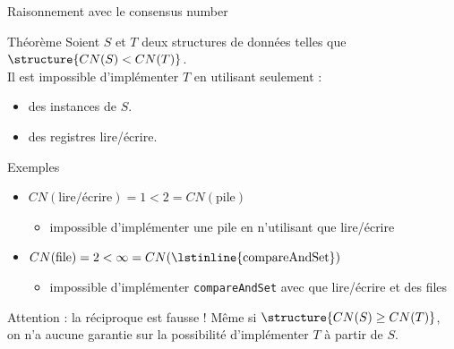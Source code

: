 
\begingroup

\begin{frame}{Raisonnement avec le consensus number}
  
  \begin{block}{Théorème}
    Soient $S$ et $T$ deux structures de données telles que $\structure{CN(S) < CN(T)}$.\\

    Il est \alert{impossible} d'implémenter $T$ en utilisant seulement :
    \begin{itemize}
    \item des instances de $S$.
    \item des registres lire/écrire.
    \end{itemize}
  \end{block}

  \begin{exampleblock}{Exemples}
    \begin{itemize}
    \item $CN(\text{lire/écrire}) = 1 < 2 = CN(\text{pile})$
      \begin{itemize}
      \item impossible d'implémenter une pile en n'utilisant que lire/écrire 
      \end{itemize}
    \item $CN(\text{file}) = 2 < \infty = CN(\text{\lstinline{compareAndSet}})$
      \begin{itemize}
      \item impossible d'implémenter \lstinline{compareAndSet} avec que lire/écrire et des files
      \end{itemize}
    \end{itemize}
  \end{exampleblock}
  
  \begin{alertblock}{Attention : la réciproque est fausse !}
    Même si $\structure{CN(S) \ge CN(T)}$, \\
    on n'a \alert{aucune garantie}
    sur la possibilité d'implémenter $T$ à partir de $S$.
  \end{alertblock}

\end{frame}

\endgroup
\endinput
